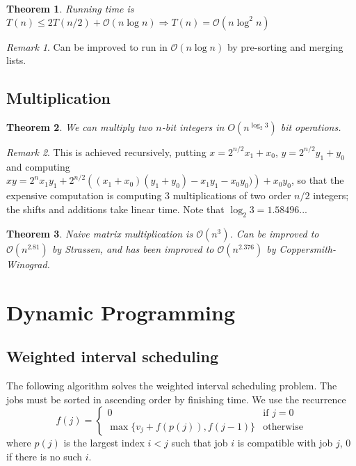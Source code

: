 \documentclass[10pt, oneside, reqno]{amsart}
\theoremstyle{plain}%
\newtheorem{thm}{Theorem}[section]
\theoremstyle{definition}
\theoremstyle{remark}
\newtheorem*{rem}{Remark}
\newcommand{\bigo}[1]{\mathcal{O}(#1)}
\begin{document}
\begin{thm}
	Running time is $T(n) \leq 2 T(n/2) + \bigo{n \log n} \Rightarrow T(n) = \bigo{n \log^2 n}$
\end{thm}


\begin{rem}
	Can be improved to run in $\bigo{n \log n}$ by pre-sorting and merging lists.
\end{rem}

\subsection{Multiplication} %
\begin{thm} We can multiply two $n$-bit integers in $O(n^{\log_2 3})$ bit operations.
\end{thm}
\begin{rem} This is achieved recursively, putting $x=2^{n/2}x_1+x_0$, $y=2^{n/2}y_1+y_0$ and computing $xy = 2^n x_1 y_1 + 2^{n/2} \left( (x_1+x_0)(y_1+y_0) - x_1y_1 - x_0y_0) \right) + x_0 y_0$, so that the expensive computation is computing $3$ multiplications of two order $n/2$ integers; the shifts and additions take linear time. Note that $\log_2 3 =1.58496...$
\end{rem}
\label{sub:multiplication}

\begin{thm}
	Naive matrix multiplication is $\bigo{n^3}$.  Can be improved to $\bigo{n^{2.81}}$ by Strassen, and has been improved to $\bigo{n^{2.376}}$ by Coppersmith-Winograd.
\end{thm}




\section{Dynamic Programming} %
\label{sec:dynamic_programming}


\subsection{Weighted interval scheduling} %
\label{sub:weighted_interval_scheduling}
The following algorithm solves the weighted interval scheduling problem.
The jobs must be sorted in ascending order by finishing time.
We use the recurrence \[
	f(j) = \begin{cases}
		0 &\text{if $j = 0$} \\
		\max \{v_j + f(p(j)), f(j-1) \} &\text{otherwise}
	\end{cases}
\] where $p(j)$ is the largest index $i < j$ such that job $i$ is compatible with job $j$, $0$ if there is no such $i$.
\end{document}
